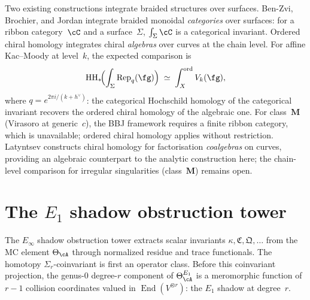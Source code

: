 \begin{remark}
\label{rem:bbj-latyntsev-comparison}
Two existing constructions integrate braided structures over
surfaces. Ben-Zvi, Brochier, and Jordan integrate braided
monoidal \emph{categories} over surfaces: for a ribbon
category~$\cC$ and a surface~$\Sigma$,
$\int_\Sigma \cC$ is a categorical invariant. Ordered chiral
homology integrates chiral \emph{algebras} over curves at the
chain level. For affine Kac--Moody at level~$k$, the expected
comparison is
\begin{equation}\label{eq:bbj-comparison}
\mathrm{HH}_*\!\Bigl(\int_\Sigma \operatorname{Rep}_q(\fg)\Bigr)
\;\simeq\;
\int_X^{\mathrm{ord}} V_k(\fg),
\end{equation}
where $q = e^{2\pi i/(k+h^\vee)}$: the categorical Hochschild homology
of the categorical invariant recovers the ordered chiral
homology of the algebraic one. For class~$\mathbf{M}$
(Virasoro at generic~$c$), the BBJ framework requires a
finite ribbon category, which is unavailable; ordered chiral
homology applies without restriction.
Latyntsev constructs chiral homology for factorisation
\emph{coalgebras} on curves, providing an algebraic
counterpart to the analytic construction here; the
chain-level comparison for irregular singularities
(class~$\mathbf{M}$) remains open.
\end{remark}



\section{The \texorpdfstring{$E_1$}{E1} shadow obstruction tower}
\label{sec:e1-shadow-tower}

The $E_\infty$ shadow obstruction tower extracts scalar invariants
$\kappa, \mathfrak{C}, \mathfrak{Q}, \ldots$ from the MC element
$\Theta_\cA$ through normalized residue and trace functionals.  The
homotopy $\Sigma_r$-coinvariant is first an operator class.  Before
this coinvariant projection, the genus-$0$
degree-$r$ component of $\Theta_\cA^{E_1}$ is a meromorphic function
of $r-1$ collision coordinates valued in
$\operatorname{End}(V^{\otimes r})$: the $E_1$ shadow at degree~$r$.

